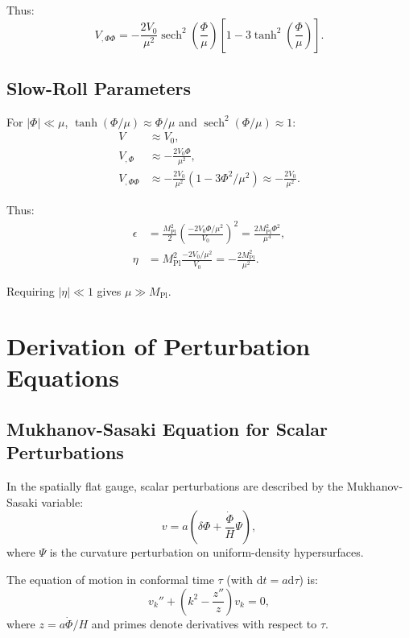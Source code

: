 \documentclass[11pt,a4paper]{article}
\numberwithin{equation}{section}
\theoremstyle{plain}
\theoremstyle{definition}
\theoremstyle{remark}
\newcommand{\dd}{\mathrm{d}}
\begin{document}
Thus:
\begin{equation}
V_{,\Phi\Phi} = -\frac{2V_0}{\mu^2}\operatorname{sech}^2\left(\frac{\Phi}{\mu}\right)\left[1 - 3\tanh^2\left(\frac{\Phi}{\mu}\right)\right].
\end{equation}

\subsection{Slow-Roll Parameters}

For $|\Phi| \ll \mu$, $\tanh(\Phi/\mu) \approx \Phi/\mu$ and $\operatorname{sech}^2(\Phi/\mu) \approx 1$:
\begin{align}
V &\approx V_0,\\
V_{,\Phi} &\approx -\frac{2V_0\Phi}{\mu^2},\\
V_{,\Phi\Phi} &\approx -\frac{2V_0}{\mu^2}(1 - 3\Phi^2/\mu^2) \approx -\frac{2V_0}{\mu^2}.
\end{align}

Thus:
\begin{align}
\epsilon &= \frac{M_{\mathrm{Pl}}^2}{2}\left(\frac{-2V_0\Phi/\mu^2}{V_0}\right)^2 = \frac{2M_{\mathrm{Pl}}^2\Phi^2}{\mu^4},\\
\eta &= M_{\mathrm{Pl}}^2\frac{-2V_0/\mu^2}{V_0} = -\frac{2M_{\mathrm{Pl}}^2}{\mu^2}.
\end{align}

Requiring $|\eta| \ll 1$ gives $\mu \gg M_{\mathrm{Pl}}$.

\section{Derivation of Perturbation Equations}
\label{app:pert}

\subsection{Mukhanov-Sasaki Equation for Scalar Perturbations}

In the spatially flat gauge, scalar perturbations are described by the Mukhanov-Sasaki variable:
\begin{equation}
v = a\left(\delta\Phi + \frac{\dot{\Phi}}{H}\Psi\right),
\end{equation}
where $\Psi$ is the curvature perturbation on uniform-density hypersurfaces.

The equation of motion in conformal time $\tau$ (with $\dd t = a\dd\tau$) is:
\begin{equation}
v_k'' + \left(k^2 - \frac{z''}{z}\right)v_k = 0,
\label{eq:MS-equation}
\end{equation}
where $z = a\dot{\Phi}/H$ and primes denote derivatives with respect to $\tau$.
\end{document}
